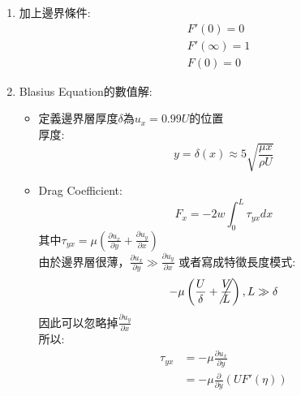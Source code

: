 \documentclass[../main.tex]{subfiles}
\begin{document}
\begin{itemize}
\begin{itemize}
\begin{enumerate}
\begin{align}
            \right)^{\frac{1}{2}} F' - F
          \right) F''= F''' \nonumber\\
        \implies & 
        \cancel{-\frac{1}{2}\left(
          \frac{\rho Uy^2}{\mu x}
        \right)^{\frac{1}{2}} F' F'' +
        \frac{1}{2}\left(
          \frac{\rho Uy^2}{\mu x}
        \right)^{\frac{1}{2}} F' F''} -
        \frac{1}{2} F F'' = F''' \nonumber\\
        \implies & F''' + \frac{1}{2} F F'' = 0\nonumber\\
        &\boxed{2F''' + F F'' = 0}
      \end{align}
      很開心對吧？但這個是Blasius Equation，到現在沒人解出來哦！
    \item  加上邊界條件:
    \begin{align}
      &F'(0) = 0 \\
      &F'(\infty) = 1 \\
      &F(0) = 0
    \end{align}
    \item Blasius Equation的數值解:
    \begin{itemize}
      \item 定義邊界層厚度$\delta$為$u_x = 0.99U$的位置\\
      厚度:
      \begin{equation}
        y = \delta(x) \approx 5\sqrt{\frac{\mu x}{\rho U}}
      \end{equation}
      \item Drag Coefficient:
      \begin{equation}
        F_x = -2 w\int_0^L \tau_{yx} dx
      \end{equation}
      其中$\tau_{yx} = \mu \left(\frac{\partial u_x}{\partial y}+ \frac{\partial u_y}{\partial x}\right)$\\
      由於邊界層很薄，$\frac{\partial u_x}{\partial y} \gg \frac{\partial u_y}{\partial x}$
      或者寫成特徵長度模式:
      \begin{equation}
        -\mu\left(\frac{U}{\delta}+\cancel{\frac{V}{L}}\right),L\gg \delta 
      \end{equation}
      因此可以忽略掉$\frac{\partial u_y}{\partial x}$\\
      所以:
      \begin{align}
        \tau_{yx} &= -\mu \frac{\partial u_x}{\partial y} \nonumber\\
        &= -\mu \frac{\partial}{\partial y} \left(
          U F'(\eta)
        \right) \nonumber\\

\end{align}
\end{itemize}
\end{enumerate}
\end{itemize}
\end{itemize}
\end{document}
